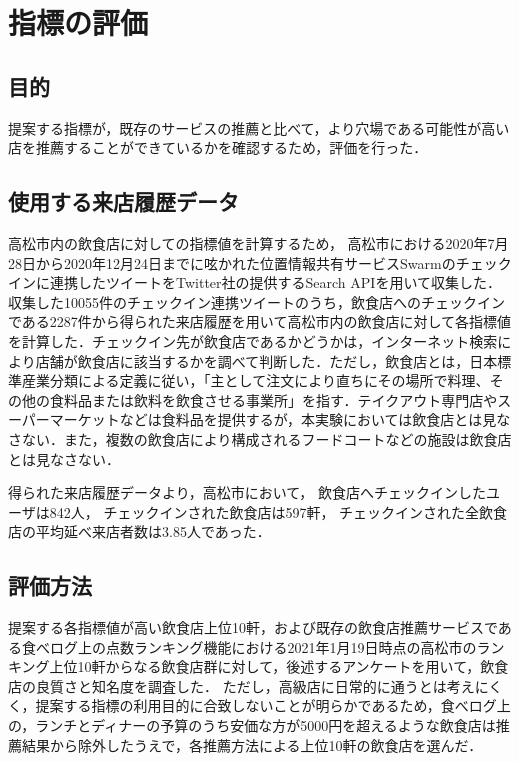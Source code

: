 \chapter{指標の評価}



\label{chap:experiment}

\section{目的}
提案する指標が，既存のサービスの推薦と比べて，より穴場である可能性が高い店を推薦することができているかを確認するため，評価を行った．

\section{使用する来店履歴データ}
高松市内の飲食店に対しての指標値を計算するため，
高松市における2020年7月28日から2020年12月24日までに呟かれた位置情報共有サービスSwarmのチェックインに連携したツイートをTwitter社の提供するSearch APIを用いて収集した．収集した10055件のチェックイン連携ツイートのうち，飲食店へのチェックインである2287件から得られた来店履歴を用いて高松市内の飲食店に対して各指標値を計算した．チェックイン先が飲食店であるかどうかは，インターネット検索により店舗が飲食店に該当するかを調べて判断した．ただし，飲食店とは，日本標準産業分類による定義\cite{restaurant}に従い，「主として注文により直ちにその場所で料理、その他の食料品または飲料を飲食させる事業所」を指す．テイクアウト専門店やスーパーマーケットなどは食料品を提供するが，本実験においては飲食店とは見なさない．また，複数の飲食店により構成されるフードコートなどの施設は飲食店とは見なさない．\par
得られた来店履歴データより，高松市において，
飲食店へチェックインしたユーザは842人，
チェックインされた飲食店は597軒，
チェックインされた全飲食店の平均延べ来店者数は3.85人であった．

\section{評価方法}
提案する各指標値が高い飲食店上位10軒，および既存の飲食店推薦サービスである食べログ上の点数ランキング機能における2021年1月19日時点の高松市のランキング上位10軒からなる飲食店群に対して，後述するアンケートを用いて，飲食店の良質さと知名度を調査した．
ただし，高級店に日常的に通うとは考えにくく，提案する指標の利用目的に合致しないことが明らかであるため，食べログ上の，ランチとディナーの予算のうち安価な方が5000円を超えるような飲食店は推薦結果から除外したうえで，各推薦方法による上位10軒の飲食店を選んだ．

